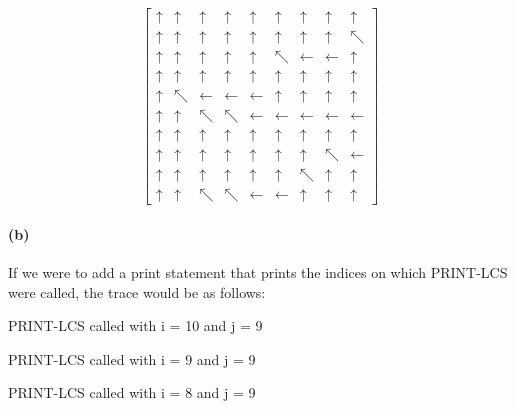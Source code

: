 \documentclass[11pt,a4paper]{article}
\begin{document}
\[
	\begin{bmatrix}
 	
 	\uparrow & \uparrow & \uparrow & \uparrow & \uparrow & \uparrow & \uparrow & \uparrow & \uparrow \\
 
 \uparrow & \uparrow & \uparrow & \uparrow & \uparrow & \uparrow & \uparrow & \uparrow & \nwarrow \\
 
 \uparrow & \uparrow & \uparrow & \uparrow & \uparrow & \nwarrow & \leftarrow & \leftarrow & \uparrow \\
 
 \uparrow & \uparrow & \uparrow & \uparrow & \uparrow & \uparrow & \uparrow & \uparrow & \uparrow \\
 
 \uparrow & \nwarrow & \leftarrow & \leftarrow & \leftarrow & \uparrow & \uparrow & \uparrow & \uparrow \\
 
 \uparrow & \uparrow & \nwarrow & \nwarrow & \leftarrow & \leftarrow & \leftarrow & \leftarrow & \leftarrow \\
 
 \uparrow & \uparrow & \uparrow & \uparrow & \uparrow & \uparrow & \uparrow & \uparrow & \uparrow \\
 
 \uparrow & \uparrow & \uparrow & \uparrow & \uparrow & \uparrow & \uparrow & \nwarrow & \leftarrow \\

 \uparrow & \uparrow & \uparrow & \uparrow & \uparrow & \uparrow & \nwarrow & \uparrow & \uparrow \\
 
 \uparrow & \uparrow & \nwarrow & \nwarrow & \leftarrow & \leftarrow & \uparrow & \uparrow & \uparrow 
 	
 	\end{bmatrix} 
 	\]


	\paragraph{(b)}
	If we were to add a print statement that prints the indices on which PRINT-LCS were called, the trace would be as follows:
	
	PRINT-LCS called with i = 10 and j = 9
	
	PRINT-LCS called with i = 9 and j = 9
	
	PRINT-LCS called with i = 8 and j = 9
	
\end{document}
